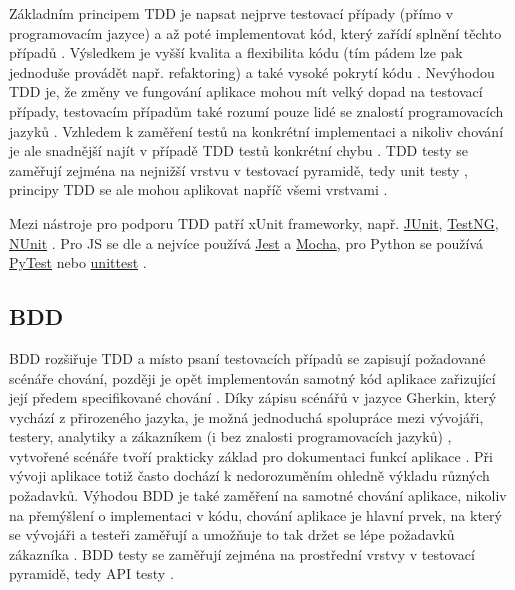 Základním principem TDD je napsat nejprve testovací případy (přímo v programovacím jazyce) a až poté implementovat kód, který zařídí splnění těchto případů \cite{test-swtestinghelp2}. Výsledkem je vyšší kvalita a flexibilita kódu (tím pádem lze pak jednoduše provádět např. refaktoring) a také vysoké pokrytí kódu \cite{test-swtestinghelp2}. Nevýhodou TDD je, že změny ve fungování aplikace mohou mít velký dopad na testovací případy, testovacím případům také rozumí pouze lidé se znalostí programovacích jazyků \cite{test-swtestinghelp2}. Vzhledem k zaměření testů na konkrétní implementaci a nikoliv chování je ale snadnější najít v případě TDD testů konkrétní chybu  \cite{test-swtestinghelp2}. TDD testy se zaměřují zejména na nejnižší vrstvu v testovací pyramidě, tedy unit testy \cite{test-swtestinghelp1}, principy TDD se ale mohou aplikovat napříč všemi vrstvami \cite{test-dzone}.

Mezi nástroje pro podporu TDD patří xUnit frameworky, např. \href{https://junit.org/}{JUnit}, \href{https://testng.org/}{TestNG}, \href{https://nunit.org/}{NUnit} \cite{test-swtestinghelp2}. Pro JS se dle \cite{test-chart-js2} a \cite{test-chart-js1} nejvíce používá \href{https://jestjs.io/}{Jest} a \href{https://mochajs.org/}{Mocha}, pro Python se používá \href{https://docs.pytest.org/en/latest/}{PyTest} nebo \href{https://docs.python.org/3/library/unittest.html}{unittest} \cite{test-chart-python}.

\subsection{BDD}

BDD rozšiřuje TDD a místo psaní testovacích případů se zapisují požadované scénáře chování, později je opět implementován samotný kód aplikace zařizující její předem specifikované chování \cite{test-swtestinghelp2}. Díky zápisu scénářů v jazyce Gherkin, který vychází z přirozeného jazyka, je možná jednoduchá spolupráce mezi vývojáři, testery, analytiky a zákazníkem (i bez znalosti programovacích jazyků) \cite{test-swtestinghelp2, test-cucumber1}, vytvořené scénáře tvoří prakticky základ pro dokumentaci funkcí aplikace \cite{test-smartbear2}. Při vývoji aplikace totiž často dochází k nedorozuměním ohledně výkladu různých požadavků. Výhodou BDD je také zaměření na samotné chování aplikace, nikoliv na přemýšlení o implementaci v kódu, chování aplikace je hlavní prvek, na který se vývojáři a testeři zaměřují a umožňuje to tak držet se lépe požadavků zákazníka \cite{test-swtestinghelp2}. BDD testy se zaměřují zejména na prostřední vrstvy v testovací pyramidě, tedy API testy \cite{test-swtestinghelp1}.

